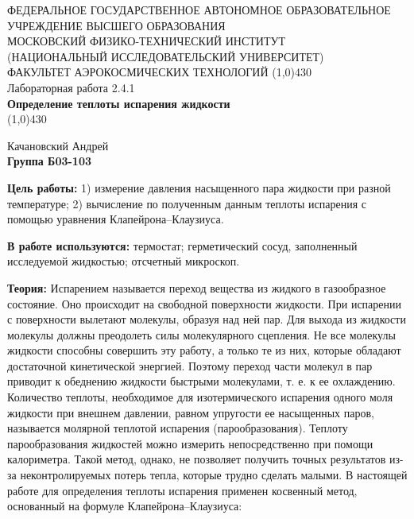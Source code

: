 \documentclass[11pt]{article}
\begin{document}
\begin{titlepage}
\begin{center}
\large{\small ФЕДЕРАЛЬНОЕ ГОСУДАРСТВЕННОЕ АВТОНОМНОЕ ОБРАЗОВАТЕЛЬНОЕ\\ УЧРЕЖДЕНИЕ ВЫСШЕГО ОБРАЗОВАНИЯ\\ МОСКОВСКИЙ ФИЗИКО-ТЕХНИЧЕСКИЙ ИНСТИТУТ\\ (НАЦИОНАЛЬНЫЙ ИССЛЕДОВАТЕЛЬСКИЙ УНИВЕРСИТЕТ)\\ ФАКУЛЬТЕТ АЭРОКОСМИЧЕСКИХ ТЕХНОЛОГИЙ}
\vfill
\line(1,0){430}\\[1mm]
\huge{Лабораторная работа 2.4.1}\\
\huge\textbf{Определение теплоты испарения жидкости}\\
\line(1,0){430}\\[1mm]
\vfill
\begin{flushright}
\normalsize{Качановский Андрей}\\
\normalsize{\textbf{Группа Б03-103}}\\
\end{flushright}
\end{center}
\end{titlepage}

\par \textbf{Цель работы:} 1) измерение давления насыщенного пара жидкости при разной температуре; 2) вычисление по полученным данным теплоты испарения с помощью уравнения Клапейрона–Клаузиуса.

\par \textbf{В работе используются:} термостат; герметический сосуд, заполненный исследуемой жидкостью; отсчетный микроскоп.

\par \textbf{Теория:} Испарением называется переход вещества из жидкого в газообразное состояние. Оно происходит на свободной поверхности жидкости. При испарении с поверхности вылетают молекулы, образуя над ней пар. Для выхода из жидкости молекулы должны преодолеть силы молекулярного сцепления. Не все молекулы жидкости способны совершить эту работу, а только те из них, которые обладают достаточной кинетической энергией. Поэтому переход части молекул в пар приводит к обеднению жидкости быстрыми молекулами, т. е. к ее охлаждению. Количество теплоты, необходимое для изотермического испарения одного моля жидкости при внешнем давлении, равном упругости ее насыщенных паров, называется молярной теплотой испарения (парообразования).
Теплоту парообразования жидкостей можно измерить непосредственно при помощи калориметра. Такой метод, однако, не позволяет получить точных результатов из-за неконтролируемых потерь тепла, которые трудно сделать малыми. В настоящей работе для определения теплоты испарения применен косвенный метод, основанный на формуле Клапейрона–Клаузиуса:
\end{document}
